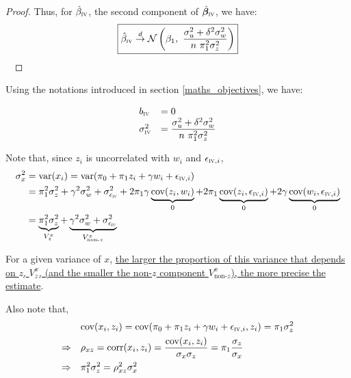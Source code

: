 \documentclass[a4paper, 11pt]{report}
\begin{document}
\begin{proof}
			Thus, for $\hat{\beta}_{\textsc{iv}}$, the second component of $\hat{\bm{\beta}}_{\textsc{iv}}$, we have:
				\begin{equation}
					\boxed{
						\hat{\beta}_{\textsc{iv}} \overset{d}{\to}
							 \mathcal{N}\left( \beta_1 , \ \dfrac{\sigma_{u}^{2} + \delta^{2}\sigma_{w}^{2}}{n \ \pi_{1}^{2}\sigma_{z}^{2}} \right) 
					}
				\end{equation}
				~
		\end{proof}
				
				Using the notations introduced in section \ref{maths_objectives}, we have:
				~
				
				\begin{equation}\label{b_sigma_iv}
					\begin{array}{lll}
						b_{\textsc{iv}} & = 0\\
					\sigma_{\textsc{iv}}^{2} & = \dfrac{\sigma_{u}^{2} + \delta^{2}\sigma_{w}^{2}}{n \ \pi_{1}^{2}\sigma_{z}^{2}}
					\end{array}				
				\end{equation}
				
				Note that, since $z_{i}$ is uncorrelated with $w_{i}$ and $\epsilon_{\textsc{iv}, i}$, 
				~
				\begin{align*}
					\sigma_{x}^{2} & =  \text{var}(x_{i}) = \text{var}(\pi_{0} + \pi_{1}z_{i} + \gamma w_{i} + \epsilon_{\textsc{iv}, i})\\
						& = \pi_{1}^{2}\sigma_{z}^{2} + \gamma^{2}\sigma_{w}^{2} + \sigma_{\epsilon_{\textsc{iv}}}^{2} + 2\pi_{1}\gamma \underbrace{\text{cov}(z_{i}, w_{i})}_{0} + 2 \pi_{1}  \underbrace{\text{cov}(z_{i}, \epsilon_{\textsc{iv}, i})}_{0} + 2\gamma \underbrace{\text{cov}(w_{i}, \epsilon_{\textsc{iv}, i})}_{0} \\
						& = \underbrace{\pi_{1}^{2}\sigma_{z}^{2}}_{V_{z}^{x}} + \underbrace{\gamma^{2}\sigma_{w}^{2} + \sigma_{\epsilon_{\textsc{iv}}}^{2}}_{V_{\text{non-}z}^{x}}
				\end{align*}
				
				For a given variance of $x$, \ul{the larger the proportion of this variance that depends on $z$, $V_{z}^{x}$, (and the smaller the non-$z$ component $V_{\text{non-}z}^{x}$), the more precise the estimate}.
				
				Also note that,
				~
				\begin{align*}
					 &\text{cov}(x_i , z_i) =  \text{cov}( \pi_0 + \pi_1 z_i + \gamma w_{i} + \epsilon_{\textsc{iv}, i} , z_i) = \pi_1 \sigma_{z}^{2}\\
					\Rightarrow \quad & 
					 \rho_{xz} = \text{corr}(x_{i}, z_{i}) = \dfrac{\text{cov}(x_{i}, z_{i})}{\sigma_x \sigma_z} = \pi_1 \dfrac{\sigma_z}{\sigma_x}\\
					\Rightarrow \quad & \pi_1^{2} \sigma_z^{2} = \rho_{xz}^{2}\sigma_{x}^{2}
				\end{align*}
				
\end{document}
